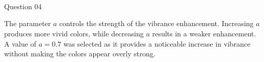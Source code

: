 \documentclass[11pt]{article}
\begin{document}
    \begin{center}
    \end{center}
    { \hspace*{\fill} \\}
    
    \begin{center}
    \end{center}
    { \hspace*{\fill} \\}
    
    \begin{center}
    \end{center}
    { \hspace*{\fill} \\}
    
    Question 04

The parameter \(a\) controls the strength of the vibrance enhancement.
Increasing \(a\) produces more vivid colors, while decreasing \(a\)
results in a weaker enhancement. A value of \(a = 0.7\) was selected as
it provides a noticeable increase in vibrance without making the colors
appear overly strong.
\end{document}
